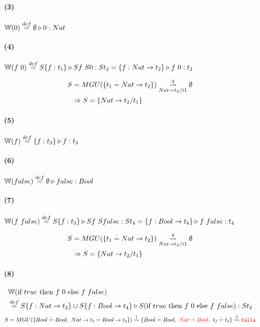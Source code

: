 \documentclass[10pt,a4paper]{article}
\begin{document}
\paragraph{(3)} $\WFunc(0) \equalDef \judgeType{\emptyset}{0}{Nat}$

\paragraph{(4)} $\WFunc(f~0) \equalDef \judgeType{S\{f:t_1\}}{Sf~S0}{St_2} = \judgeType{\{f:Nat\to t_2\}}{f~0}{t_2}$

\begin{centrado}
\begin{align*}
S &= MGU(\{t_1\equalDot Nat \to t_2\}) \goesTo{4}{Nat\to t_2/t1}  \emptyset \\
&\Rightarrow S=\{Nat\to t_2/t_1\}
\end{align*}
\end{centrado}

\vspace*{5mm}
\begin{multicols}{2}
\paragraph{(5)} $\WFunc(f) \equalDef \judgeType{\{f:t_3\}}{f}{t_3}$

\paragraph{(6)} $\WFunc(false) \equalDef \judgeType{\emptyset}{false}{Bool}$
\end{multicols}


\paragraph{(7)} $\WFunc(f~false) \equalDef \judgeType{S\{f:t_3\}}{Sf~Sfalse}{St_4} = \judgeType{\{f:Bool\to t_4\}}{f~false}{t_4}$

\begin{centrado}
\begin{align*}
S &= MGU(\{t_1\equalDot Nat \to t_2\}) \goesTo{4}{Nat\to t_2/t1}  \emptyset \\
&\Rightarrow S=\{Nat\to t_2/t_1\}
\end{align*}
\end{centrado}



\paragraph{(8)} 
\begin{align*}
&\WFunc(\lambdaIf{true}{f~0}{f~false}) \\
&\equalDef \judgeType{S\{f:Nat\to t_2\} \cup S\{f:Bool\to t_4\}}{S(\lambdaIf{true}{f~0}{f~false})}{St_2} \\
\end{align*}
\begin{align*}
S &= MGU(\{Bool\equalDot Bool,~Nat\to t_2 \equalDot Bool \to t_4\}) \goesTo{1}{} \{Bool\equalDot Bool,~\red{Nat \equalDot Bool},~t_2 \equalDot t_4\} \goesTo{5}{} \falla\\
\end{align*}
\end{document}
